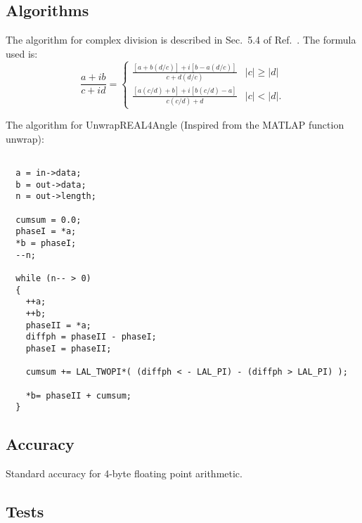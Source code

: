 \documentclass{article}
\begin{document}
\subsection{Algorithms}

The algorithm for complex division is described in
Sec.~5.4 of Ref.~\cite{ptvf:1992}.  The formula used is:
\[
  \frac{a + ib}{c + id} = \left\{
  \begin{array}{ll}
    \frac{[a + b(d/c)] + i[b - a(d/c)]}{c + d(d/c)} & |c| \ge |d| \\
    \frac{[a(c/d) + b] + i[b(c/d) - a]}{c(c/d) + d} & |c| < |d|.
  \end{array}
  \right.
\]

The algorithm for UnwrapREAL4Angle
 (Inspired from the MATLAP function unwrap):
\begin{verbatim}

  a = in->data;
  b = out->data;
  n = out->length;
  
  cumsum = 0.0;
  phaseI = *a;
  *b = phaseI;
  --n;

  while (n-- > 0)
  {
    ++a;
    ++b;
    phaseII = *a;
    diffph = phaseII - phaseI;
    phaseI = phaseII;
    
    cumsum += LAL_TWOPI*( (diffph < - LAL_PI) - (diffph > LAL_PI) );
    
    *b= phaseII + cumsum;
  }

\end{verbatim}



\subsection{Accuracy}


Standard accuracy for 4-byte floating point arithmetic.

\subsection{Tests}

\end{document}
